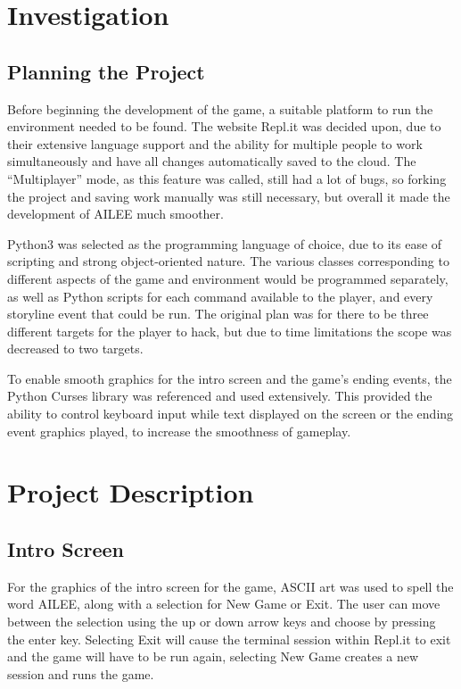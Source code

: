 \documentclass[conference]{IEEEtran}
\begin{document}
\section{Investigation}

\subsection{Planning the Project}

Before beginning the development of the game, a suitable platform to run the environment needed to be found. The website Repl.it was decided upon, due to their extensive language support and the ability for multiple people to work simultaneously and have all changes automatically saved to the cloud. \cite{b1} The “Multiplayer” mode, as this feature was called, still had a lot of bugs, so forking the project and saving work manually was still necessary, but overall it made the development of AILEE much smoother. 

Python3 was selected as the programming language of choice, due to its ease of scripting and strong object-oriented nature. The various classes corresponding to different aspects of the game and environment would be programmed separately, as well as Python scripts for each command available to the player, and every storyline event that could be run. The original plan was for there to be three different targets for the player to hack, but due to time limitations the scope was decreased to two targets.

To enable smooth graphics for the intro screen and the game’s ending events, the Python Curses library was referenced and used extensively. \cite{b2} This provided the ability to control keyboard input while text displayed on the screen or the ending event graphics played, to increase the smoothness of gameplay. 

\section{Project Description}

\subsection{Intro Screen}\label{AA}
For the graphics of the intro screen for the game, ASCII art was used to spell the word AILEE, along with a selection for New Game or Exit. The user can move between the selection using the up or down arrow keys and choose by pressing the enter key. Selecting Exit will cause the terminal session within Repl.it to exit and the game will have to be run again, selecting New Game creates a new session and runs the game. 
\end{document}
